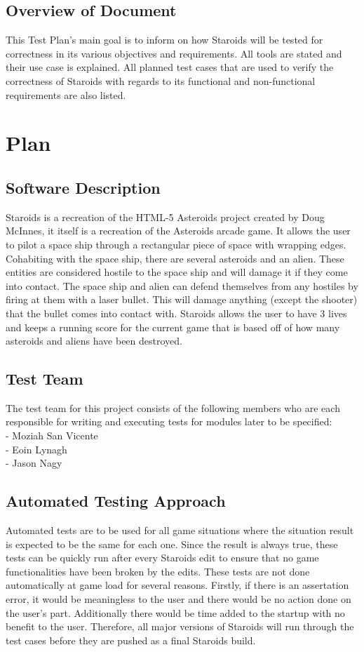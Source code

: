 \documentclass[12pt, titlepage]{article}
\begin{document}
\subsection{Overview of Document}
This Test Plan's main goal is to inform on how Staroids will be tested for correctness in its various objectives and requirements. All tools are stated and their use case is explained. All planned test cases that are used to verify the correctness of Staroids with regards to its functional and non-functional requirements are also listed.

\section{Plan}

\subsection{Software Description}
Staroids is a recreation of the HTML-5 Asteroids project created by Doug McInnes, it itself is a recreation of the Asteroids arcade game. It allows the user to pilot a space ship through a rectangular piece of space with wrapping edges. Cohabiting with the space ship, there are several asteroids and an alien. These entities are considered hostile to the space ship and will damage it if they come into contact. The space ship and alien can defend themselves from any hostiles by firing at them with a laser bullet. This will damage anything (except the shooter) that the bullet comes into contact with. Staroids allows the user to have 3 lives and keeps a running score for the current game that is based off of how many asteroids and aliens have been destroyed.

\subsection{Test Team}
The test team for this project consists of the following members who are each responsible for writing and executing tests for modules later to be specified:\\
- Moziah San Vicente\\
- Eoin Lynagh\\
- Jason Nagy\\

\subsection{Automated Testing Approach}
Automated tests are to be used for all game situations where the situation result is expected to be the same for each one. Since the result is always true, these tests can be quickly run after every Staroids edit to ensure that no game functionalities have been broken by the edits. These tests are not done automatically at game load for several reasons. Firstly, if there is an assertation error, it would be meaningless to the user and there would be no action done on the user's part. Additionally there would be time added to the startup with no benefit to the user. Therefore, all major versions of Staroids will run through the test cases before they are pushed as a final Staroids build.
\end{document}
